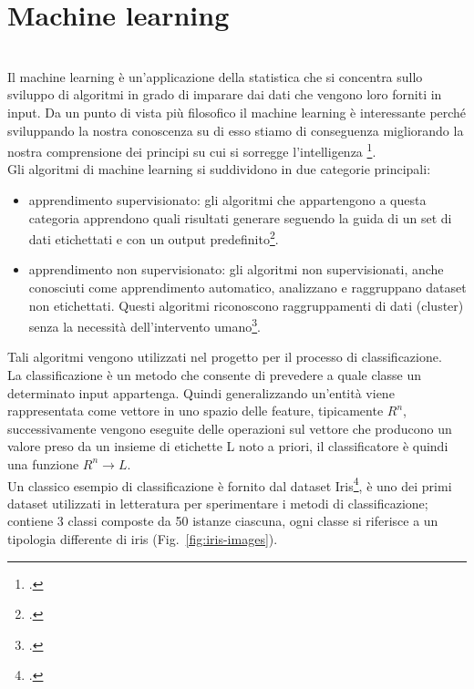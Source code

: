 \chapter{Machine learning}
\label{cap:teoria}
\\Il machine learning è un'applicazione della statistica che si concentra sullo sviluppo di algoritmi in grado di imparare dai dati che vengono loro forniti in input.
Da un punto di vista più filosofico il machine learning è interessante perché sviluppando la nostra conoscenza su di esso stiamo di conseguenza migliorando la nostra comprensione dei principi su cui si sorregge l'intelligenza \footcite[p.~97]{Goodfellow-et-al-2016}.\\Gli algoritmi di machine learning si suddividono in due categorie principali:

\begin{itemize}
    \item apprendimento supervisionato: gli algoritmi che appartengono a questa categoria apprendono quali risultati generare seguendo la guida di un set di dati etichettati e con un output predefinito\footcite{site:machine-learning}.

    \item apprendimento non supervisionato: gli algoritmi non supervisionati, anche conosciuti come apprendimento automatico, analizzano e raggruppano dataset non etichettati. Questi algoritmi riconoscono raggruppamenti di dati (cluster) senza la necessità dell'intervento umano\footcite{site:machine-learning}.
\end{itemize}
Tali algoritmi vengono utilizzati nel progetto per il processo di classificazione.\\
La classificazione è un metodo che consente di prevedere a quale classe un determinato input appartenga. 
Quindi generalizzando un'entità viene rappresentata come vettore in uno spazio delle feature, tipicamente \( R^n \), successivamente vengono eseguite delle operazioni sul vettore che producono un valore preso da un insieme di etichette L noto a priori, il classificatore è quindi una funzione \( R^n \rightarrow L \).\\Un classico esempio di classificazione è fornito dal dataset Iris\footcite{site:iris-dataset}, è uno dei primi dataset utilizzati in letteratura per sperimentare i metodi di classificazione; contiene 3 classi composte da 50 istanze ciascuna, ogni classe si riferisce a un tipologia differente di iris (Fig.~\ref{fig:iris-images}).

